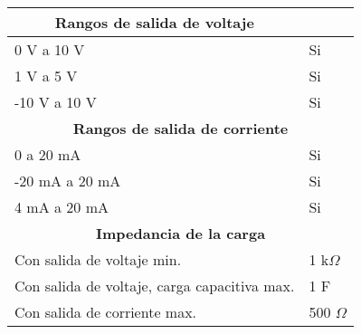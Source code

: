 \begin{table}[ht]
\begin{tabular}{|l|l|}
\multicolumn{1}{|c|}{\textbf{Rangos de salida de voltaje}}                                  &                                                                                    \\ \hline
0 V a 10 V                                                                                  & Si                                                                                 \\ \hline
1 V a 5 V                                                                                   & Si                                                                                 \\ \hline
-10 V a 10 V                                                                                & Si                                                                                 \\ \hline
\multicolumn{2}{|c|}{\textbf{Rangos de salida de corriente}}                                                                                                                     \\ \hline
0 a 20 mA                                                                                   & Si                                                                                 \\ \hline
-20 mA a 20 mA                                                                              & Si                                                                                 \\ \hline
4 mA a 20 mA                                                                                & Si                                                                                 \\ \hline
\multicolumn{2}{|c|}{\textbf{Impedancia de la carga}}                                                                                                                            \\ \hline
Con salida de voltaje min.                                                                  & 1 k$\Omega$                                                                                \\ \hline
Con salida de voltaje, carga capacitiva max.                                                & 1 F                                                                                \\ \hline
Con salida de corriente max.                                                                & 500 $\Omega$                                                                                \\ \hline

\end{tabular}
\end{table}
